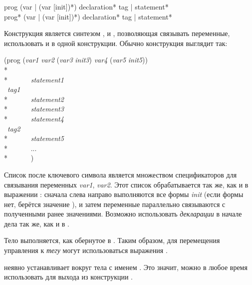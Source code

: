 \begin{defmac}
prog ({var | (var [init])}*) {declaration}* {tag | statement}* \\
prog* ({var | (var [init])}*) {declaration}* {tag | statement}*

Конструкция  является синтезом ,  и ,
позволяющая связывать переменные, использовать  и  в одной
конструкции. Обычно конструкция  выглядит так:
\begin{lisp}
(prog (\emph{var1} \emph{var2} (\emph{var3} \emph{init3}) \emph{var4} (\emph{var5} \emph{init5})) \\*
~~~~~~ \\*
~~~~~~\emph{statement1} \\
~\emph{tag1} \\*
~~~~~~\emph{statement2} \\*
~~~~~~\emph{statement3} \\*
~~~~~~\emph{statement4} \\
~\emph{tag2} \\*
~~~~~~\emph{statement5} \\*
~~~~~~... \\*
~~~~~~)
\end{lisp}
Список после ключевого символа  является множеством спецификаторов для
связывания переменных \emph{var1}, \emph{var2}.
Этот список обрабатывается так же, как и в выражении :
сначала слева направо выполняются все формы \emph{init} (если формы нет, берётся
значение {\false}), и затем переменные параллельно связываются с полученными
ранее значениями. 
Возможно использовать \emph{декларации} в начале дела  так же, как и в
.

Тело  выполняется, как обернутое в . Таким образом, для
перемещения управления к \emph{тегу} могут использоваться выражения .

 неявно устанавливает вокруг тела  с именем {\nil}. Это
значит, можно в любое время использовать  для выхода из конструкции .


\end{defmac}
